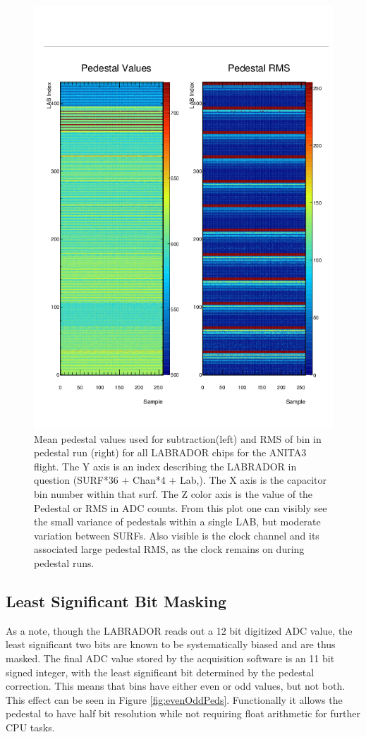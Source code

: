 \begin{figure}
	\centering
	\includegraphics[height=0.8\textheight]{figures/Pedestals_big2}
	\caption{Mean pedestal values used for subtraction(left) and RMS of bin in pedestal run (right) for all LABRADOR chips for the ANITA3 flight.  The Y axis is an index describing the LABRADOR in question (SURF*36 + Chan*4 + Lab,).  The X axis is the capacitor bin number within that surf.  The Z color axis is the value of the Pedestal or RMS in ADC counts.  From this plot one can visibly see the small variance of pedestals within a single LAB, but moderate variation between SURFs.  Also visible is the clock channel and its associated large pedestal RMS, as the clock remains on during pedestal runs.}
	\label{fig:pedestals}
\end{figure}	
				
				
	\subsection{Least Significant Bit Masking}
		As a note, though the LABRADOR reads out a 12 bit digitized ADC value, the least significant two bits are known to be systematically biased and are thus masked.  The final ADC value stored by the acquisition software is an 11 bit signed integer, with the least significant bit determined by the pedestal correction.  This means that bins have either even or odd values, but not both.  This effect can be seen in Figure \ref{fig:evenOddPeds}.  Functionally it allows the pedestal to have half bit resolution while not requiring float arithmetic for further CPU tasks.
		
